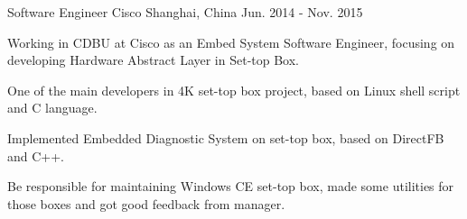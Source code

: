 \begin{cventries}
  \cventry
    {Software Engineer} %
    {Cisco} %
    {Shanghai, China} %
    {Jun. 2014 - Nov. 2015} %
    {
      \begin{cvitems} %
        \item {Working in CDBU at Cisco as an Embed System Software Engineer, focusing on developing Hardware Abstract Layer in Set-top Box.}
        \item {One of the main developers in 4K set-top box project, based on Linux shell script and C language.}
        \item {Implemented Embedded Diagnostic System on set-top box, based on DirectFB and C++.}
        \item {Be responsible for maintaining Windows CE set-top box, made some utilities for those boxes and got good feedback from manager.}
      \end{cvitems}
    }




\end{cventries}
